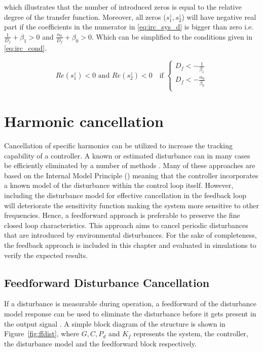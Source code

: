 which illustrates that the number of introduced zeros is equal to the relative degree of the transfer function. Moreover, all zeros ($s^z_1, s^z_2$) will have negative real part if the coefficients in the numerator in \eqref{eq:irc_sys_d} is bigger than zero i.e. $ \frac{1}{D_f} + \beta_1>0$ and $\frac{\alpha_0}{D_f} + \beta_0>0$. Which can be simplified to the conditions given in \eqref{eq:irc_cond}.

\begin{equation}
  \label{eq:irc_cond}
  Re(s^z_1) < 0 \text{ and } Re(s^z_2) < 0 \quad \text{if }
  \begin{cases}
    D_f < -\frac{1}{\beta_1}\\
    D_f < -\frac{\alpha_0}{\beta_0}\\
  \end{cases}
\end{equation}

\section{Harmonic cancellation}
Cancellation of specific harmonics can be utilized to increase the tracking capability of a controller. A known or estimated disturbance can in many cases be efficiently eliminated by a number of methods \citep{fujimoto2009rro, fujimoto2004repetitive, vilanova2008disturbance}. Many of these approaches are based on the Internal Model Principle (\abbrIMP) meaning that the controller incorporates a known model of the disturbance within the control loop itself. However, including the disturbance model for effective cancellation in the feedback loop will deteriorate the sensitivity function making the system more sensitive to other frequencies. Hence, a feedforward approach is preferable to preserve the fine closed loop characteristics. This approach aims to cancel periodic disturbances that are introduced by environmental disturbances. For the sake of completeness, the \abbrIMP feedback approach is included in this chapter and evaluated in simulations to verify the expected results.

\subsection{Feedforward Disturbance Cancellation}\label{subsec:distff}
If a disturbance is measurable during operation, a feedforward of the disturbance model response can be used to eliminate the disturbance before it gets present in the output signal \citep{industrial}. A simple block diagram of the structure is shown in Figure~\ref{fig:ffdist}, where $G, C, P_d$ and $K_f$ represents the system, the controller, the disturbance model and the feedforward block respectively.


